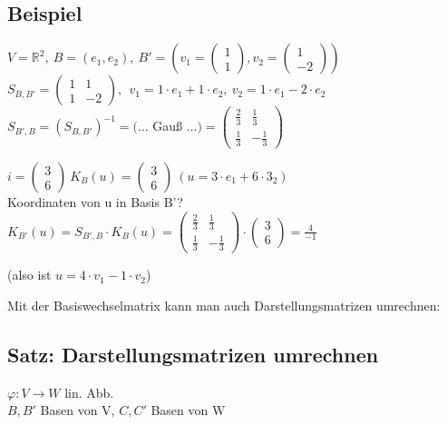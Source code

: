 \subsection{Beispiel}
$V=\mathbb{R}^2, \ B=(e_1,e_2), \ B'=\left(v_1=\begin{pmatrix}1 \\ 1\end{pmatrix}, v_2=\begin{pmatrix}1 \\ -2\end{pmatrix}\right)$\\
$S_{B,B'}=\begin{pmatrix}1 & 1 \\ 1 & -2 \end{pmatrix}, \ \ v_1=1\cdot e_1+1\cdot e_2, \ v_2=1\cdot e_1-2\cdot e_2$\\
$S_{B',B}=(S_{B,B'})^{-1}=(\dots$ Gauß $\dots)=\begin{pmatrix}\frac{2}{3} & \frac{1}{3} \\ \frac{1}{3} & -\frac{1}{3}\end{pmatrix}$

$i=\begin{pmatrix}3 \\ 6\end{pmatrix} \ K_B(u)=\begin{pmatrix}3 \\ 6\end{pmatrix} \ (u=3\cdot e_1+6\cdot 3_2)$\\
Koordinaten von u in Basis B'?\\
$K_{B'}(u)=S_{B',B}\cdot K_B(u)=\begin{pmatrix}\frac{2}{3} & \frac{1}{3} \\ \frac{1}{3} & -\frac{1}{3}\end{pmatrix}\cdot \begin{pmatrix}3 \\ 6\end{pmatrix}=\frac{4}{-1}$

(also ist $u=4\cdot v_1-1\cdot v_2$)

Mit der Basiswechselmatrix kann man auch Darstellungsmatrizen umrechnen:

\subsection{Satz: Darstellungsmatrizen umrechnen}
$\varphi: V\rightarrow W$ lin. Abb.\\
$B,B'$ Basen von V, $C,C'$ Basen von W

